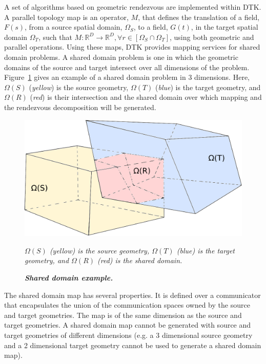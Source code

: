 \documentclass{mc2013}
\begin{document}
A set of algorithms based on geometric rendezvous are implemented
within DTK. A parallel topology map is an operator, $M$, that defines
the translation of a field, $F(s)$, from a source spatial domain,
$\Omega_S$, to a field, $G(t)$, in the target spatial domain
$\Omega_T$, such that $M: \mathbb{R}^D \rightarrow \mathbb{R}^D,
\forall r \in [\Omega_S \cap \Omega_T]$, using both geometric and
parallel operations. Using these maps, DTK provides mapping services
for shared domain problems. A shared domain problem is one in which
the geometric domains of the source and target intersect over all
dimensions of the problem. Figure~\ref{fig:shared_domain} gives an
example of a shared domain problem in 3 dimensions. Here, $\Omega(S)$
({\sl yellow}) is the source geometry, $\Omega(T)$ ({\sl blue}) is the
target geometry, and $\Omega(R)$ ({\sl red}) is their intersection and
the shared domain over which mapping and the rendezvous decomposition
will be generated.

\begin{figure}[htpb!]
  \centering \includegraphics[width=5in]{overlapping_domain.pdf}
  \caption{\bf \sl Shared domain example.} {\sl $\Omega(S)$ (yellow)
    is the source geometry, $\Omega(T)$ (blue) is the target geometry,
    and $\Omega(R)$ (red) is the shared domain.}
  \label{fig:shared_domain}
\end{figure}

The shared domain map has several properties. It is defined over a
communicator that encapsulates the union of the communication spaces
owned by the source and target geometries. The map is of the same
dimension as the source and target geometries. A shared domain map
cannot be generated with source and target geometries of different
dimensions (e.g. a 3 dimensional source geometry and a 2 dimensional
target geometry cannot be used to generate a shared domain map).
\end{document}
